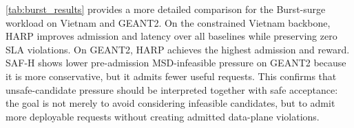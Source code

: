 \documentclass[final,5p]{elsarticle}
\begin{document}
\begin{table}[t]
\centering
\caption{Stress simulation summary: safe acceptance rate across topologies and workloads (\%).}
\label{tab:simulation_acceptance_summary}
\renewcommand{\arraystretch}{1.15}
\scriptsize
{}
\end{table}

\autoref{tab:burst_results} provides a more detailed comparison for the Burst-surge workload on Vietnam and GEANT2. On the constrained Vietnam backbone, HARP improves admission and latency over all baselines while preserving zero SLA violations. On GEANT2, HARP achieves the highest admission and reward. SAF-H shows lower pre-admission MSD-infeasible pressure on GEANT2 because it is more conservative, but it admits fewer useful requests. This confirms that unsafe-candidate pressure should be interpreted together with safe acceptance: the goal is not merely to avoid considering infeasible candidates, but to admit more deployable requests without creating admitted data-plane violations.
\end{document}
